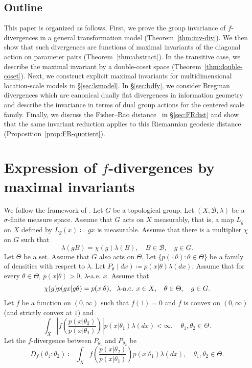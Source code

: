 \documentclass[a4paper, reqno, 11pt]{article}
\theoremstyle{definition}
\begin{document}
\subsection{Outline}
This paper is organized as follows. 
First, we prove the group invariance of $f$-divergences in a general transformation model (Theorem~\ref{thm:inv-div}). 
We then show that such divergences are functions of maximal invariants of the diagonal action on parameter pairs (Theorem~\ref{thm:abstract}). 
In the transitive case, we describe the maximal invariant by a double-coset space (Theorem~\ref{thm:double-coset}). 
Next, we construct explicit maximal invariants for multidimensional location-scale models in \S\ref{sec:lsmodel}. 
In \S\ref{sec:bdfy}, we consider Bregman divergences which are canonical dually flat divergences in information geometry~\cite{IG-2016} and describe the invariance in terms of dual group actions for the centered scale family.
Finally, we discuss the Fisher--Rao distance~\cite{Rao-1945} in \S\ref{sec:FRdist} and show that the same invariant reduction applies to this Riemannian  
geodesic distance (Proposition~\ref{prop:FR-quotient}).
 
\section{Expression of \texorpdfstring{$f$}{f}-divergences by maximal invariants}

We follow the framework of \cite[Section 3]{Eaton1989}.  
Let $G$ be a topological group. 
Let $(X, \mathcal{B}, \lambda)$ be a $\sigma$-finite measure space. 
Assume that $G$ acts on $X$ measurably, that is, a map $L_g$ on $X$ defined by $L_g (x) \coloneqq   gx$ is measurable. 
Assume that there is a multiplier $\chi$ on $G$ such that 
\begin{equation}\label{eq:rel-inv-mu}
\lambda(gB) = \chi(g) \lambda(B), \quad B \in \mathcal{B}, \quad g \in G. 
\end{equation} 
Let $\Theta$ be a set. 
Assume that $G$ also acts on $\Theta$. 
Let $\{p(\cdot | \theta)\colon\theta \in \Theta\}$ be a family of densities with respect to $\lambda$. 
Let $P_{\theta}(dx) \coloneqq   p(x|\theta)\lambda(dx)$. 
Assume that for every $\theta \in \Theta$, $p(x|\theta) > 0$, $\lambda$-a.e. $x$. 
Assume that 
\begin{equation}\label{eq:inv-density} 
\chi(g) p(gx | g\theta) = p(x|\theta), \ \textup{ $\lambda$-a.e. } x \in X, \quad \theta \in \Theta, \quad g \in G.   
\end{equation}
Let $f$ be a function on $(0,\infty)$ such that $f(1) = 0$ and $f$ is convex on $(0,\infty)$ (and strictly convex at $1$) and 
\[ \int_{X} \left|f \left( \frac{p(x|\theta_2)}{p(x|\theta_1)} \right)\right| p(x|\theta_1) \lambda(dx) < \infty, \quad  \theta_1, \theta_2 \in \Theta. \]
Let the $f$-divergence between $P_{\theta_1}$ and $P_{\theta_2}$ be 
\[ D_f (\theta_1\colon\theta_2) \coloneqq    \int_{X} f \left( \frac{p(x|\theta_2)}{p(x|\theta_1)} \right) p(x|\theta_1) \lambda(dx), \quad  \theta_1, \theta_2 \in \Theta. \]
\end{document}

